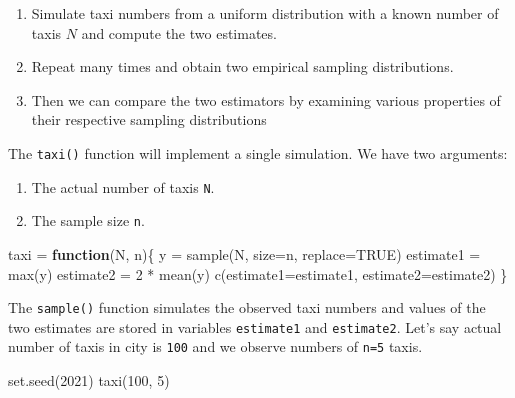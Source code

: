 \documentclass[
]{book}
\newenvironment{Shaded}{\begin{snugshade}}{\end{snugshade}}
\newcommand{\AttributeTok}[1]{\textcolor[rgb]{0.77,0.63,0.00}{#1}}
\newcommand{\ConstantTok}[1]{\textcolor[rgb]{0.00,0.00,0.00}{#1}}
\newcommand{\ControlFlowTok}[1]{\textcolor[rgb]{0.13,0.29,0.53}{\textbf{#1}}}
\newcommand{\DecValTok}[1]{\textcolor[rgb]{0.00,0.00,0.81}{#1}}
\newcommand{\FunctionTok}[1]{\textcolor[rgb]{0.00,0.00,0.00}{#1}}
\newcommand{\NormalTok}[1]{#1}
\newcommand{\OtherTok}[1]{\textcolor[rgb]{0.56,0.35,0.01}{#1}}
\newcommand{\SpecialCharTok}[1]{\textcolor[rgb]{0.00,0.00,0.00}{#1}}
\providecommand{\tightlist}{%
  \setlength{\itemsep}{0pt}\setlength{\parskip}{0pt}}
\theoremstyle{definition}
\theoremstyle{definition}
\theoremstyle{definition}
\theoremstyle{definition}
\theoremstyle{remark}
\begin{document}
\begin{enumerate}
\def\labelenumi{\arabic{enumi}.}
\tightlist
\item
  Simulate taxi numbers from a uniform distribution with a known number of taxis \(N\) and compute the two estimates.
\item
  Repeat many times and obtain two empirical sampling distributions.
\item
  Then we can compare the two estimators by examining various properties of their respective sampling distributions
\end{enumerate}

The \texttt{taxi()} function will implement a single simulation. We have two arguments:

\begin{enumerate}
\def\labelenumi{\arabic{enumi}.}
\tightlist
\item
  The actual number of taxis \texttt{N}.
\item
  The sample size \texttt{n}.
\end{enumerate}

\begin{Shaded}
\begin{Highlighting}[]
\NormalTok{taxi }\OtherTok{=} \ControlFlowTok{function}\NormalTok{(N, n)\{}
\NormalTok{  y }\OtherTok{=} \FunctionTok{sample}\NormalTok{(N, }\AttributeTok{size=}\NormalTok{n, }\AttributeTok{replace=}\ConstantTok{TRUE}\NormalTok{)}
\NormalTok{  estimate1 }\OtherTok{=} \FunctionTok{max}\NormalTok{(y)}
\NormalTok{  estimate2 }\OtherTok{=} \DecValTok{2} \SpecialCharTok{*} \FunctionTok{mean}\NormalTok{(y)}
  \FunctionTok{c}\NormalTok{(}\AttributeTok{estimate1=}\NormalTok{estimate1, }\AttributeTok{estimate2=}\NormalTok{estimate2)}
\NormalTok{\}}
\end{Highlighting}
\end{Shaded}

The \texttt{sample()} function simulates the observed taxi numbers and values of the two estimates are stored in variables \texttt{estimate1} and \texttt{estimate2}. Let's say actual number of taxis in city is \texttt{100} and we observe numbers of \texttt{n=5} taxis.

\begin{Shaded}
\begin{Highlighting}[]
\FunctionTok{set.seed}\NormalTok{(}\DecValTok{2021}\NormalTok{)}
\FunctionTok{taxi}\NormalTok{(}\DecValTok{100}\NormalTok{, }\DecValTok{5}\NormalTok{)}
\end{Highlighting}
\end{Shaded}
\end{document}
